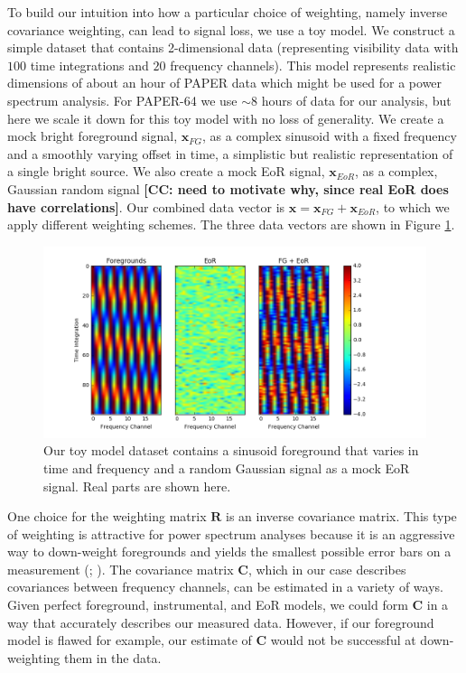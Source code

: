 \documentclass[preprint2,numberedappendix,tighten]{aastex6}  %
\newcommand{\cc}[1]{{\color{purple} \textbf{[CC: #1]}}}
\begin{document}
To build our intuition into how a particular choice of weighting, namely inverse covariance weighting, can lead to signal loss, we use a toy model. We construct a simple dataset that contains 2-dimensional data (representing visibility data with $100$ time integrations and $20$ frequency channels). This model represents realistic dimensions of about an hour of PAPER data which might be used for a power spectrum analysis. For PAPER-64 we use $\sim$$8$ hours of data for our analysis, but here we scale it down for this toy model with no loss of generality. We create a mock bright foreground signal, $\textbf{x}_{FG}$, as a complex sinusoid with a fixed frequency and a smoothly varying offset in time, a simplistic but realistic representation of a single bright source. We also create a mock EoR signal, $\textbf{x}_{EoR}$, as a complex, Gaussian random signal \cc{need to motivate why, since real EoR does have correlations}. Our combined data vector is $\textbf{x} = \textbf{x}_{FG} + \textbf{x}_{EoR}$, to which we apply different weighting schemes. The three data vectors are shown in Figure \ref{fig:toy_sigloss1}. 

\begin{figure}
	\centering
	\includegraphics[trim={1.5cm 0.2cm 3.5cm 0.3cm},clip,width=\columnwidth]{plots/toy_sigloss1.png}
	\caption{Our toy model dataset contains a sinusoid foreground that varies in time and frequency and a random Gaussian signal as a mock EoR signal. Real parts are shown here.}
	\label{fig:toy_sigloss1}
\end{figure}

One choice for the weighting matrix $\textbf{R}$ is an inverse covariance matrix. This type of weighting is attractive for power spectrum analyses because it is an aggressive way to down-weight foregrounds and yields the smallest possible error bars on a measurement (\citealt{tegmark_et_al1997a}; \citealt{bond_et_al1998}). The covariance matrix $\textbf{C}$, which in our case describes covariances between frequency channels, can be estimated in a variety of ways. Given perfect foreground, instrumental, and EoR models, we could form $\textbf{C}$ in a way that accurately describes our measured data. However, if our foreground model is flawed for example, our estimate of $\textbf{C}$ would not be successful at down-weighting them in the data. 
\end{document}
